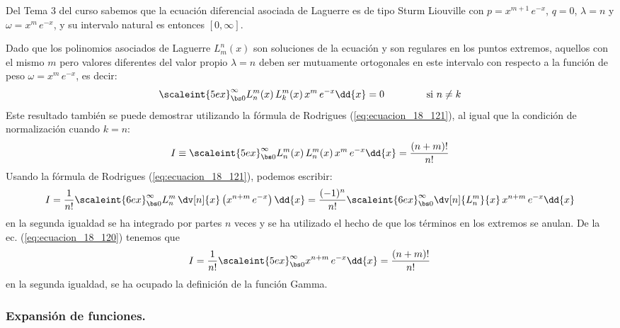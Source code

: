 Del Tema 3 del curso sabemos que la ecuación diferencial asociada de Laguerre es de tipo Sturm Liouville con $p = x^{m+1} \, e^{-x}$, $q = 0$, $\lambda = n$ y $\omega = x^{m} \, e^{-x}$, y su intervalo natural es entonces $[0, \infty]$.
\par
Dado que los polinomios asociados de Laguerre $L_{m}^{n} (x)$ son soluciones de la ecuación y son regulares en los puntos extremos, aquellos con el mismo $m$ pero valores diferentes del valor propio $\lambda = n$ deben ser mutuamente ortogonales en este intervalo con respecto a la función de peso $\omega = x^{m} \, e^{-x}$, es decir:
\begin{align*}
\scaleint{5ex}_{\bs 0}^{\infty} L_{n}^{m} (x) \, L_{k}^{m} (x) \, x^{m} \, e^{-x} \dd{x} = 0 \hspace{1.5cm} \mbox{si } n \neq k
\end{align*}
Este resultado también se puede demostrar utilizando la fórmula de Rodrigues (\ref{eq:ecuacion_18_121}), al igual que la condición de normalización cuando $k = n$:
\begin{align}
I \equiv \scaleint{5ex}_{\bs 0}^{\infty} L_{n}^{m} (x) \, L_{n}^{m} (x) \, x^{m} \, e^{-x} \dd{x} =\dfrac{(n + m)!}{n!}
\label{eq:ecuacion_18_122}
\end{align}
Usando la fórmula de Rodrigues (\ref{eq:ecuacion_18_121}), podemos escribir:
\begin{align*}
I = \dfrac{1}{n!} \scaleint{6ex}_{\bs 0}^{\infty} L_{n}^{m} \, \dv[n]{x} \left( x^{n+m} \, e^{-x} \right) \dd{x} = \dfrac{(-1)^{n}}{n!} \scaleint{6ex}_{\bs 0}^{\infty} \dv[n]{L_{n}^{m}}{x} \, x^{n+m} \, e^{-x} \dd{x}
\end{align*}
en la segunda igualdad se ha integrado por partes $n$ veces y se ha utilizado el hecho de que los términos en los extremos se anulan. De la ec. (\ref{eq:ecuacion_18_120}) tenemos que 
\begin{align*}
I = \dfrac{1}{n!} \scaleint{5ex}_{\bs 0}^{\infty} x^{n+m} \, e^{-x} \dd{x} = \dfrac{(n + m)!}{n!}
\end{align*}
en la segunda igualdad, se ha ocupado la definición de la función Gamma.

\subsubsection{Expansión de funciones.}

